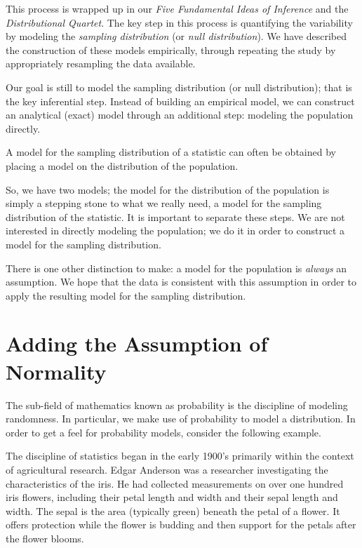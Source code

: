 \documentclass[]{book}
\theoremstyle{definition}
\theoremstyle{definition}
\theoremstyle{definition}
\theoremstyle{remark}
\let\BeginKnitrBlock\begin \let\EndKnitrBlock\end
\begin{document}
This process is wrapped up in our \emph{Five Fundamental Ideas of
Inference} and the \emph{Distributional Quartet}. The key step in this
process is quantifying the variability by modeling the \emph{sampling
distribution} (or \emph{null distribution}). We have described the
construction of these models empirically, through repeating the study by
appropriately resampling the data available.

Our goal is still to model the sampling distribution (or null
distribution); that is the key inferential step. Instead of building an
empirical model, we can construct an analytical (exact) model through an
additional step: modeling the population directly.

\BeginKnitrBlock{rmdkeyidea}
A model for the sampling distribution of a statistic can often be
obtained by placing a model on the distribution of the population.
\EndKnitrBlock{rmdkeyidea}

So, we have two models; the model for the distribution of the population
is simply a stepping stone to what we really need, a model for the
sampling distribution of the statistic. It is important to separate
these steps. We are not interested in directly modeling the population;
we do it in order to construct a model for the sampling distribution.

There is one other distinction to make: a model for the population is
\emph{always} an assumption. We hope that the data is consistent with
this assumption in order to apply the resulting model for the sampling
distribution.

\section{Adding the Assumption of
Normality}\label{adding-the-assumption-of-normality}

The sub-field of mathematics known as probability is the discipline of
modeling randomness. In particular, we make use of probability to model
a distribution. In order to get a feel for probability models, consider
the following example.

\BeginKnitrBlock{example}[Iris Characteristics]
\protect\hypertarget{exm:ex-iris}{}{\label{exm:ex-iris} {} }The discipline of statistics began in the early
1900's primarily within the context of agricultural research. Edgar
Anderson was a researcher investigating the characteristics of the iris.
He had collected measurements on over one hundred iris flowers,
including their petal length and width and their sepal length and width.
The sepal is the area (typically green) beneath the petal of a flower.
It offers protection while the flower is budding and then support for
the petals after the flower blooms.
\EndKnitrBlock{example}
\end{document}
